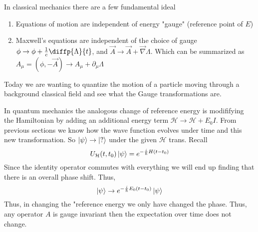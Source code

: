 In classical mechanics there are a few fundamental ideal
\begin{enumerate}
    \item Equations of motion are independent of energy "gauge" (reference point of $E$)
    \item Maxwell's equations are independent of the choice of gauge
        $\phi \rightarrow \phi +  \frac{1}{c} \diffp{\Lambda}{t}$, and
        $\vec{A} \rightarrow \vec{A} + \vec{\nabla} \Lambda$. Which can be summarized as
        $A_{\mu} = \left(\phi, -\vec{A}\right) \rightarrow
        A_{\mu} + \partial_{\mu} \Lambda$
\end{enumerate}
Today we are wanting to quantize the motion of a particle moving through a background classical
field and see what the Gauge transformations are.

In quantum mechanics the analogous change of reference energy is modififying the 
Hamiltonian by adding an additional energy term $\mathcal{H} \rightarrow \mathcal{H} + E_0 I$.
From previous sections we know how the wave function evolves under time and this new
transformation. So $\Ket{\psi} \rightarrow \Ket{?}$ under the given $\mathcal{H}$ trans.
Recall
$$
    U_{\mathcal{H}} (t, t_0) \Ket{\psi} =
    e^{-\frac{i}{\hbar} H (t - t_0)}
$$
Since the identity operator commutes with everything we will end up finding that
there is an overall phase shift. Thus,
$$
    \Ket{\psi} \rightarrow e^{-\frac{i}{\hbar} E_0 (t - t_0)} \Ket{\psi}
$$
Thus, in changing the "reference energy we only have changed the phase. Thus,
any operator $A$ is gauge invariant then the expectation over time does not change.

